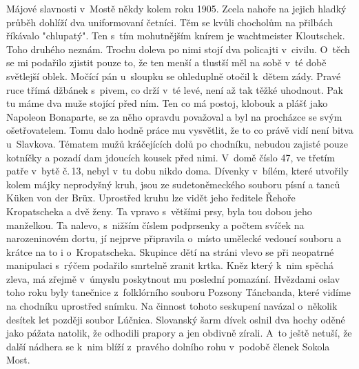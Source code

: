
Májové slavnosti v~Mostě někdy kolem roku 1905. Zcela nahoře na jejich
hladký průběh dohlíží dva uniformovaní četníci. Těm se kvůli chocholům
na přilbách říkávalo "chlupatý". Ten s~tím mohutnějším knírem je
wachtmeister Kloutschek. Toho druhého neznám. Trochu doleva po nimi
stojí dva policajti v~civilu. O~těch se mi podařilo zjistit pouze to,
že ten menší a tlustší měl na sobě v~té době světlejší oblek. Močící
pán u~sloupku se ohleduplně otočil k~dětem zády. Pravé ruce třímá
džbánek s~pivem, co drží v~té levé, není až tak těžké uhodnout. Pak tu
máme dva muže stojící před ním. Ten co má postoj, klobouk a plášť
jako Napoleon Bonaparte, se za něho opravdu považoval a byl na
procházce se svým ošetřovatelem. Tomu dalo hodně práce mu vysvětlit,
že to co právě vidí není bitva u~Slavkova. Tématem mužů kráčejících
dolů po chodníku, nebudou zajisté pouze kotníčky a pozadí dam jdoucích
kousek před nimi. V~domě číslo 47, ve třetím patře v~bytě č.\,13, nebyl
v~tu dobu nikdo doma. Dívenky v~bílém, které utvořily kolem májky
neprodyšný kruh, jsou ze sudetoněmeckého souboru písní a tanců Küken
von der Brüx. Uprostřed kruhu lze vidět jeho ředitele Řehoře
Kropatscheka a dvě ženy. Ta vpravo s~většími prsy, byla tou dobou jeho
manželkou. Ta nalevo, s~nižším číslem podprsenky a počtem svíček na
narozeninovém dortu, jí nejprve připravila o~místo umělecké vedoucí
souboru a krátce na to i o~Kropatscheka. Skupince dětí na stráni vlevo
se při neopatrné manipulaci s~rýčem podařilo smrtelně zranit krtka.
Kněz který k~nim spěchá zleva, má zřejmě v~úmyslu poskytnout mu
poslední pomazání. Hvězdami oslav toho roku byly tanečnice
z~folklórního souboru Pozsony Táncbanda, které vidíme na chodníku
uprostřed snímku. Na činnost tohoto seskupení navázal o~několik
desítek let později soubor Lúčnica. Slovanský šarm dívek oslnil dva
hochy oděné jako pážata natolik, že odhodili prapory a jen obdivně
zírali. A~to ještě netuší, že další nádhera se k~nim blíží z~pravého
dolního rohu v~podobě členek Sokola Most.

